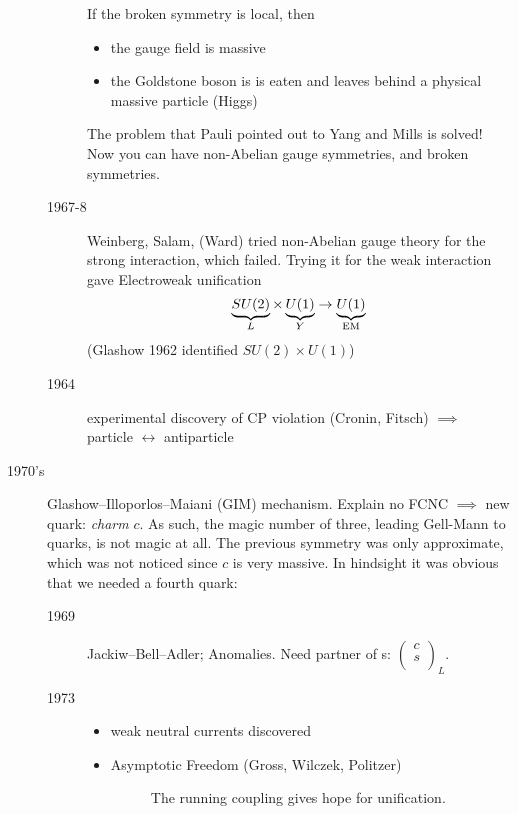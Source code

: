 \begin{description}
\begin{description}
      If the broken symmetry is local, then
      \begin{itemize}
	\item the gauge field is massive
	\item the Goldstone boson is is eaten and leaves behind a physical massive particle (Higgs)
      \end{itemize}

      The problem that Pauli pointed out to Yang and Mills is solved! Now you can have non-Abelian gauge symmetries, and broken symmetries.
    \item[1967-8] Weinberg, Salam, (Ward) tried non-Abelian gauge theory for the strong interaction, which failed. Trying it for the weak interaction gave Electroweak unification 
      \begin{equation}
	\underbrace{SU(2)}_{\mathclap{L}} \times \underbrace{U(1)}_{\mathclap{Y}} \to \underbrace{U(1)}_{\mathclap{\text{EM}}}
      \end{equation}
      (Glashow 1962 identified $SU(2) \times U(1)$)
    \item[1964] experimental discovery of CP violation (Cronin, Fitsch) $\implies$ particle $\leftrightarrow$ antiparticle
    \end{description}
  \item[1970's] Glashow--Illoporlos--Maiani (GIM) mechanism.
      Explain no FCNC $\implies$ new quark: \emph{charm} $c$.
      As such, the magic number of three, leading Gell-Mann to quarks, is not magic at all.
      The previous symmetry was only approximate, which was not noticed since $c$ is very massive.
      In hindsight it was obvious that we needed a fourth quark:
      \begin{description}
	\item[1969] Jackiw--Bell--Adler; Anomalies. Need partner of s: $ \begin{pmatrix} c \\ s \\ \end{pmatrix}_L $.
	\item[1973] 
	  \begin{itemize}
	    \item weak neutral currents discovered
	    \item Asymptotic Freedom (Gross, Wilczek, Politzer)
	      \begin{figure}[tbhp]
	        \centering
	        \def\svgwidth{0.4\columnwidth}
	        
	        \caption{The running coupling gives hope for unification.}

\end{figure}
\end{itemize}
\end{description}
\end{description}
